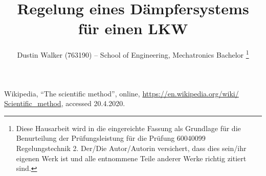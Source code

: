 \documentclass[a4paper, 10pt]{IEEEtran}
\title{Regelung eines Dämpfersystems für einen LKW}%
\author{Dustin Walker (763190)%
			-- School of Engineering, Mechatronics Bachelor %
			\thanks{Diese Hausarbeit wird in die eingereichte Fassung als Grundlage für die Benurteilung 
		            der Prüfungsleistung für die Prüfung
	            	60040099 %
	            	Regelungstechnik 2. %
            	 	Der/Die Autor/Autorin versichert, dass dies sein/ihr eigenen Werk ist und alle entnommene Teile anderer Werke richtig zitiert sind.
             		}}
\begin{document}
	
	\maketitle
	
	
	
	\begin{thebibliography}{1em}
		 Wikipedia, ``The scientific method'', online, \url{https://en.wikipedia.org/wiki/		 
		Scientific_method}, accessed 20.4.2020.
	\end{thebibliography}
\end{document}
